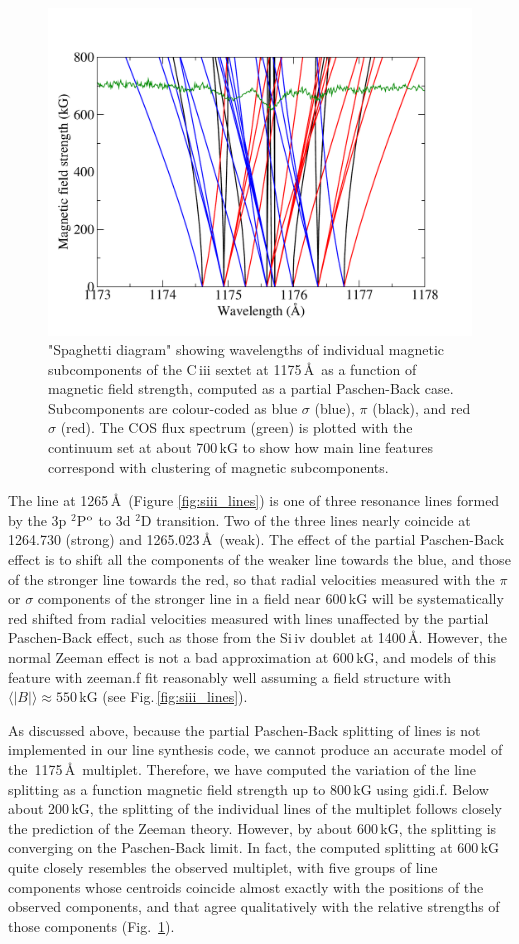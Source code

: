 \documentclass[fleqn,usenatbib]{mnras}
\newcommand{\bs}{\ensuremath{\langle \vert B \vert \rangle}}
\begin{document}
\begin{figure}
    \centering
    \includegraphics[width=9 cm]{publ_fig_spaghetti-diag-thick-ciii-1175-cccet.pdf}
    \caption{"Spaghetti diagram" showing wavelengths of individual magnetic subcomponents of the C\,{\sc iii} sextet at 1175\,\AA\ as a function of magnetic field strength, computed as a partial Paschen-Back case. Subcomponents are colour-coded as blue $\sigma$ (blue), $\pi$ (black), and red $\sigma$ (red). The COS flux spectrum (green) is plotted with the continuum set at about 700\,kG to show how main line features correspond with clustering of magnetic subcomponents.}
    \label{fig:ciii_ppe_obs}
\end{figure}

The   line at 1265\,\AA\ (Figure \ref{fig:siii_lines}) is one of three resonance lines formed by the 3p $^2$P$^{\rm o}$ to 3d $^2$D transition. Two of the three lines nearly coincide at 1264.730 (strong) and 1265.023\,\AA\ (weak). The effect of the partial Paschen-Back effect is to shift all the components of the weaker line towards the blue, and those of the stronger line towards the red, so that radial velocities measured with the $\pi$ or $\sigma$ components of the stronger line in a field near 600\,kG will be systematically red shifted from radial velocities measured with lines unaffected by the partial Paschen-Back effect, such as those from the Si\,{\sc iv} doublet at 1400\,\AA. However, the normal Zeeman effect is not a bad approximation at 600\,kG, and models of this feature with {\sc zeeman.f} fit reasonably well assuming a field structure with $\bs \approx 550$\,kG (see Fig.\,\ref{fig:siii_lines}).

As discussed above, because the partial Paschen-Back splitting of lines is not implemented in our line synthesis code, we cannot produce an accurate model of the  \,1175\,\AA\ multiplet. Therefore, we have computed the variation of the line splitting as a function magnetic field strength up to 800\,kG using {\sc gidi.f}. Below about 200\,kG, the splitting of the individual lines of the multiplet follows closely the prediction of the Zeeman theory. However, by about 600\,kG, the splitting is converging on the Paschen-Back limit. In fact, the computed splitting at 600\,kG quite closely resembles the observed multiplet, with five groups of line components whose centroids coincide almost exactly with the positions of the observed components, and that agree qualitatively with the relative strengths of those components (Fig.~\ref{fig:ciii_ppe_obs}).
\end{document}
